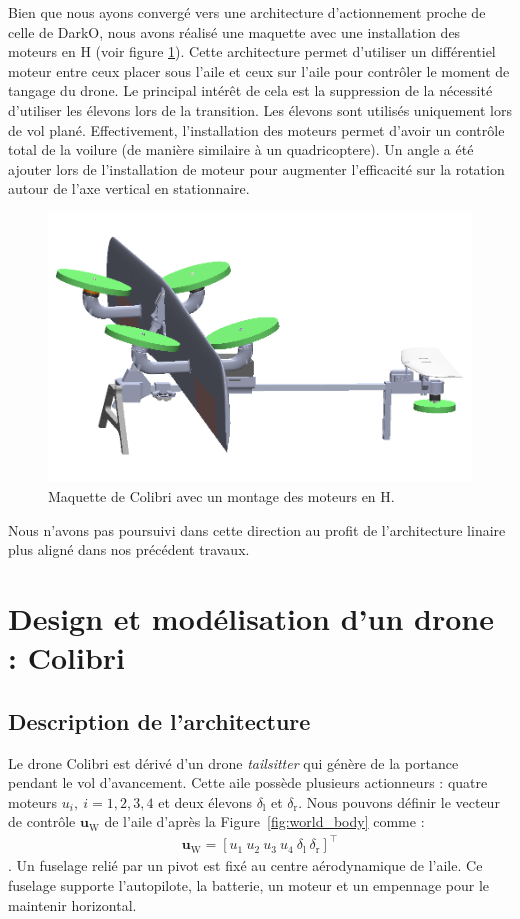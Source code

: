 { {
    \color{green}
    Bien que nous ayons convergé vers une architecture d'actionnement proche de celle de DarkO, nous avons réalisé une maquette avec une installation des moteurs en H (voir figure \ref{fig:ColibriH}). Cette architecture permet d'utiliser un différentiel moteur entre ceux placer sous l'aile et ceux sur l'aile pour contrôler le moment de tangage du drone. Le principal intérêt de cela est la suppression de la nécessité d'utiliser les élevons lors de la transition. Les élevons sont utilisés uniquement lors de vol plané.
    Effectivement, l'installation des moteurs permet d'avoir un contrôle total de la voilure (de manière similaire à un quadricoptere). Un angle a été ajouter lors de l'installation de moteur pour augmenter l'efficacité sur la rotation autour de l'axe vertical en stationnaire.
    \begin{figure}[ht!]
        \centering
       \includegraphics[width=0.8\columnwidth]{figures/colibriH.png}
        \caption{Maquette de Colibri avec un montage des moteurs en H.}
        \label{fig:ColibriH}
    \end{figure}
    Nous n'avons pas poursuivi dans cette direction au profit de l'architecture linaire plus aligné dans nos précédent travaux.
 }

}


\section{Design et modélisation d'un drone : Colibri}
\label{sec:model_colibri}

\subsection{Description de l'architecture}
Le drone Colibri est dérivé d'un drone \textit{tailsitter} qui génère de la portance pendant le vol d'avancement. Cette aile possède plusieurs actionneurs : quatre moteurs $u_{i}, ~i = 1,2,3,4$ et deux élevons $\delta_{\text{l}}$ et $\delta_{\text{r}}$. Nous pouvons définir le vecteur de contrôle $\boldsymbol{u}_{\text{W}}$ de l'aile d'après la Figure~\ref{fig:world_body} comme :
\begin{align}
    \label{eq:uw}
    \boldsymbol{u}_{\text{W}} = [u_{1}~u_{2}~u_{3}~u_{4}~\delta_{\text{l}}~\delta_{\text{r}}]^\top
\end{align}. Un fuselage relié par un pivot est fixé au centre aérodynamique de l'aile. Ce fuselage supporte l'autopilote, la batterie, un moteur et un empennage pour le maintenir horizontal.

